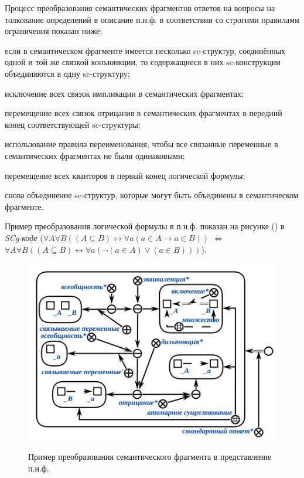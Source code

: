 Процесс преобразования семантических фрагментов ответов на вопросы на толкование определений в описание п.н.ф. в соответствии со строгими правилами ограничения показан ниже:

\begin{textitemize}
	\item если в семантическом фрагменте имеется несколько sc-структур, соединённых одной и той же связкой конъюнкции, то содержащиеся в них sc-конструкции объединяются в одну sc-структуру;
	
	\item исключение всех связок импликации в семантических фрагментах;
	
	\item перемещение всех связок отрицания в семантических фрагментах в передний конец соответствующей sc-структуры;
	
	\item использование правила переименования, чтобы все связанные переменные в семантических фрагментах не были одинаковыми;
	
	\item перемещение всех кванторов в первый конец логической формулы;
	
	\item снова объединение sc-структур, которые могут быть объединены в семантическом фрагменте.
	
\end{textitemize}

Пример преобразования логической формулы в п.н.ф. показан на рисунке (\textit{}) в \textit{SCg-коде} ($\forall A\forall B((A\subseteq B) \leftrightarrow \forall a(a\in A\rightarrow a\in B))$ $\Leftrightarrow$ $\forall A\forall B((A\subseteq B) \leftrightarrow \forall a ( \neg ( a\in A ) \lor (a\in B)))$).

\begin{figure}[H]
	\caption{Пример преобразования семантического фрагмента в представление п.н.ф.}
	\includegraphics[scale=0.8]{author/part7/figures/PNF_example.png}
	\label{fig:PNF_example}
\end{figure}

